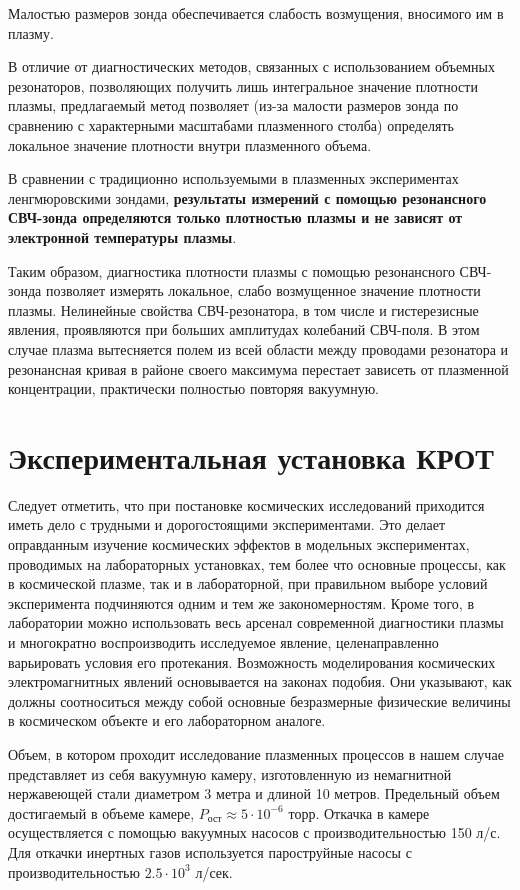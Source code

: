 Малостью размеров зонда обеспечивается слабость возмущения, вносимого им в плазму.

В отличие от диагностических методов, связанных с использованием объемных резонаторов, позволяющих получить лишь интегральное значение плотности плазмы, предлагаемый метод позволяет (из-за малости размеров зонда по сравнению с характерными масштабами плазменного столба) определять локальное значение плотности внутри плазменного объема.

В сравнении с традиционно используемыми в плазменных экспериментах ленгмюровскими зондами, \textbf{результаты измерений с помощью резонансного СВЧ-зонда определяются только плотностью плазмы и не зависят от электронной температуры плазмы}.

Таким образом, диагностика плотности плазмы с помощью резонансного СВЧ-зонда позволяет измерять локальное, слабо возмущенное значение плотности плазмы.
Нелинейные свойства СВЧ-резонатора, в том числе и гистерезисные явления, проявляются при больших амплитудах колебаний СВЧ-поля. В этом случае плазма вытесняется полем из всей области между проводами резонатора и резонансная кривая в районе своего максимума перестает зависеть от плазменной концентрации, практически полностью повторяя вакуумную. 

\section{Экспериментальная установка КРОТ} %

Следует отметить, что при постановке космических исследований приходится иметь дело с трудными и дорогостоящими экспериментами. Это делает оправданным изучение космических эффектов в модельных экспериментах, проводимых на лабораторных установках, тем более что основные процессы, как в космической плазме, так и в лабораторной, при правильном выборе условий эксперимента подчиняются одним и тем же закономерностям. Кроме того, в лаборатории можно использовать весь арсенал современной диагностики плазмы и многократно воспроизводить исследуемое явление, целенаправленно варьировать условия его протекания. Возможность моделирования космических электромагнитных явлений основывается на законах подобия. Они указывают, как должны соотноситься между собой основные безразмерные физические величины в космическом объекте и его лабораторном аналоге. 

Объем, в котором проходит исследование плазменных процессов в нашем случае
представляет из себя вакуумную камеру, изготовленную из немагнитной нержавеющей стали диаметром 3 метра и длиной 10 метров. 
Предельный объем достигаемый в объеме камере, $P_{\text{ост}}\approx 5\cdot 10^{-6}$ торр. Откачка в камере осуществляется с помощью вакуумных насосов с производительностью 150 л/с.  Для откачки инертных газов используется пароструйные насосы с производительностью $2.5\cdot10^3$ л/сек. 

